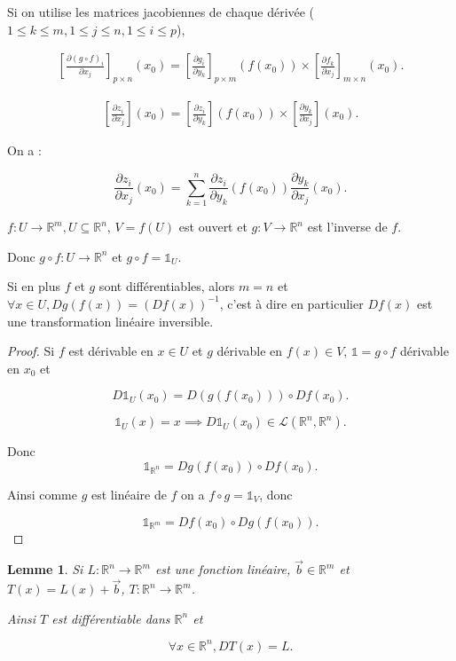 \documentclass[french]{article}
\newtheorem*{lemma}{Lemme}
\begin{document}
Si on utilise les matrices jacobiennes de chaque dérivée ($1 \leq k \leq m, 1 \leq j \leq n, 1 \leq i \leq p$),

\begin{gather*}
  \left[ \frac{\partial (g \circ f)_i }{\partial x_j}  \right]_{p \times n}(x_0) = \left[ \frac{\partial g_i }{\partial y_k }  \right] _{p \times m}(f(x_0))  \times \left[ \frac{\partial f_k }{\partial x_j} \right] _{m \times n}(x_0).
\end{gather*}

\begin{gather*}
  \left[ \frac{\partial z_i }{\partial x_j } \right](x_0) = \left[ \frac{\partial z_i }{\partial y_k } \right](f(x_0)) \times \left[\frac{\partial y_k }{\partial x_j} \right](x_0).
\end{gather*}

On a :

$$ \frac{\partial z_i }{\partial x_j } (x_0) = \sum_{k=1}^{n} \frac{\partial z_i }{\partial y_k}  (f(x_0)) \frac{\partial y_k }{\partial x_j} (x_0). $$

$f : U \to \mathbb{R}^m, U \subseteq \mathbb{R}^n$, $V = f(U)$ est ouvert et $g : V \to \mathbb{R}^n$ est l'inverse de $f$.

Donc $g \circ f : U \to \mathbb{R}^n$ et $g \circ f = \mathds{1} _{U}$.

Si en plus $f$ et $g$ sont différentiables, alors $m=n$ et $\forall x \in U, Dg(f(x)) = (Df(x)) ^{-1} $, c'est à dire en particulier $Df(x)$ est une transformation linéaire inversible.

\begin{proof}
  Si $f$ est dérivable en $x \in U$ et $g$ dérivable en $f(x) \in V$,  $\mathds{1} = g \circ f$ dérivable en $x_0$ et

  $$ D \mathds{1} _{U}(x_0) = D(g(f(x_0))) \circ Df(x_0).$$

  $$ \mathds{1} _{U}(x) = x \implies D \mathds{1} _{U}(x_0) \in \mathscr{L}(\mathbb{R}^n, \mathbb{R}^n).$$

  Donc  $$ \mathds{1} _{\mathbb{R}^n} = Dg(f(x_0)) \circ Df(x_0).$$

  Ainsi comme $g$ est linéaire de $f$ on a $f \circ g = \mathds{1} _{V}$, donc

  $$ \mathds{1} _{\mathbb{R}^m} = Df(x_0) \circ Dg(f(x_0)).$$
\end{proof}

\begin{lemma}
  Si $L : \mathbb{R}^n \to \mathbb{R}^m$ est une fonction linéaire, $\overrightarrow{ b } \in \mathbb{R}^m $ et $T(x) = L(x) + \overrightarrow{ b } $, $T : \mathbb{R}^n \to \mathbb{R}^m$.

  Ainsi $T$ est différentiable dans $\mathbb{R}^n$ et

  $$ \forall x \in \mathbb{R}^n, DT(x) = L.$$
\end{lemma}
\end{document}

